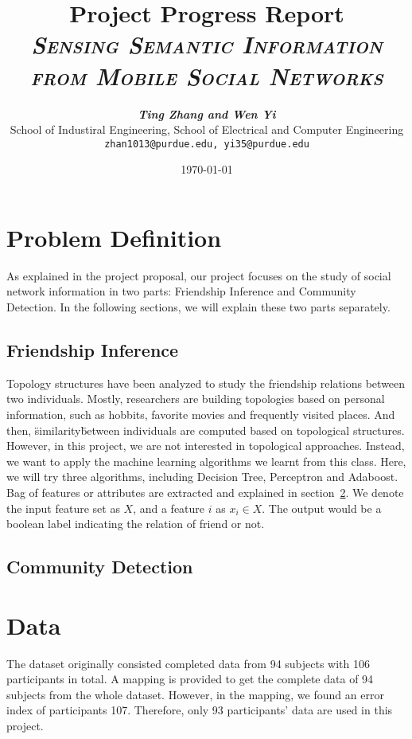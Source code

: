 \documentclass[11pt]{article}
\title{
\textbf{Project Progress Report} \\ \textsc{\textit{Sensing Semantic Information from Mobile Social Networks}} \\
}
\author{
	\textbf{\textit{Ting Zhang and Wen Yi}} \\
	School of Industiral Engineering, School of Electrical and Computer Engineering\\
	\texttt{zhan1013@purdue.edu, yi35@purdue.edu}
}
\date{\today}
\begin{document}
\maketitle


\section{Problem Definition}
As explained in the project proposal, our project focuses on the study of social network information in two parts:  Friendship Inference and Community Detection. In the following sections, we will explain these two parts separately.
\subsection{Friendship Inference}
Topology structures have been analyzed to study the friendship relations between two individuals. Mostly, researchers are building topologies based on personal information, such as hobbits, favorite movies and frequently visited places. And then, \"similarity\" between individuals are computed based on topological structures. However, in this project, we are not interested in topological approaches. Instead, we want to apply the machine learning algorithms we learnt from this class. Here, we will try three algorithms, including Decision Tree, Perceptron and Adaboost. Bag of features or attributes are extracted and explained in section~\ref{sec2}. We denote the input feature set as \(X\), and a feature \(i\) as \(x_i \in X\). The output would be a boolean label indicating the relation of friend or not.

\subsection{Community Detection}

\section{Data}\label{sec2}
The dataset originally consisted completed data from 94 subjects with 106 participants in total. A mapping is provided to get the complete data of 94 subjects from the whole dataset. However, in the mapping, we found an error index of participants 107. Therefore, only 93 participants' data are used in this project. 
\end{document}
